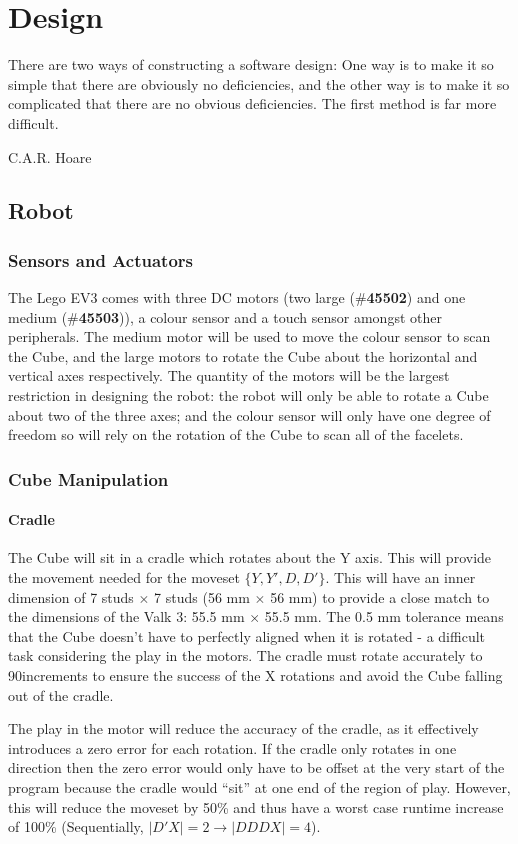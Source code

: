 \documentclass{report}
\newcommand{\legopiece}[1]{(\#\textbf{#1})}
\begin{document}
    \newpage
    \chapter{Design}
    \epigraph{There are two ways of constructing a software design: One way is to make it so simple that there are obviously no deficiencies, and the other way is to make it so complicated that there are no obvious deficiencies. The first method is far more difficult.}{C.A.R. Hoare\cite{Hoare1981}}
    \section{Robot}
    \subsection{Sensors and Actuators}
    The Lego EV3 comes with three DC motors (two large \legopiece{45502} and one medium \legopiece{45503}), a colour sensor and a touch sensor amongst other peripherals. The medium motor will be used to move the colour sensor to scan the Cube, and the large motors to rotate the Cube about the horizontal and vertical axes respectively. The quantity of the motors will be the largest restriction in designing the robot: the robot will only be able to rotate a Cube about two of the three axes; and the colour sensor will only have one degree of freedom so will rely on the rotation of the Cube to scan all of the facelets.
    
    \subsection{Cube Manipulation}
    \subsubsection{Cradle}
    The Cube will sit in a cradle which rotates about the Y axis. This will provide the movement needed for the moveset $ \{Y, Y', D, D'\}$. This will have an inner dimension of 7 studs $\times$ 7 studs (56 mm $\times$ 56 mm) to provide a close match to the dimensions of the Valk 3: 55.5 mm $\times$ 55.5 mm. The 0.5 mm tolerance means that the Cube doesn't have to perfectly aligned when it is rotated - a difficult task considering the play in the motors. The cradle must rotate accurately to 90\degree increments to ensure the success of the X rotations and avoid the Cube falling out of the cradle. 
    
    The play in the motor will reduce the accuracy of the cradle, as it effectively introduces a zero error for each rotation. If the cradle only rotates in one direction then the zero error would only have to be offset at the very start of the program because the cradle would \enquote{sit} at one end of the region of play. However, this will reduce the moveset by 50\% and thus have a worst case runtime increase of 100\% (Sequentially, $|D' X| = 2 \rightarrow |D D D X| = 4 $).
    
\end{document}
